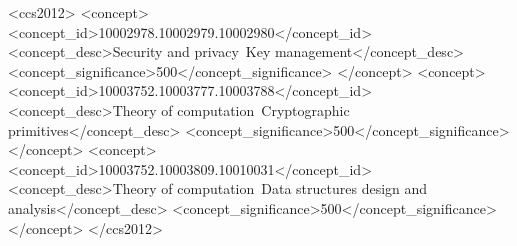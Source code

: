 %
%
\begin{CCSXML}
    <ccs2012>
    <concept>
    <concept_id>10002978.10002979.10002980</concept_id>
    <concept_desc>Security and privacy~Key management</concept_desc>
    <concept_significance>500</concept_significance>
    </concept>
    <concept>
    <concept_id>10003752.10003777.10003788</concept_id>
    <concept_desc>Theory of computation~Cryptographic primitives</concept_desc>
    <concept_significance>500</concept_significance>
    </concept>
    <concept>
    <concept_id>10003752.10003809.10010031</concept_id>
    <concept_desc>Theory of computation~Data structures design and analysis</concept_desc>
    <concept_significance>500</concept_significance>
    </concept>
    </ccs2012>
\end{CCSXML}

